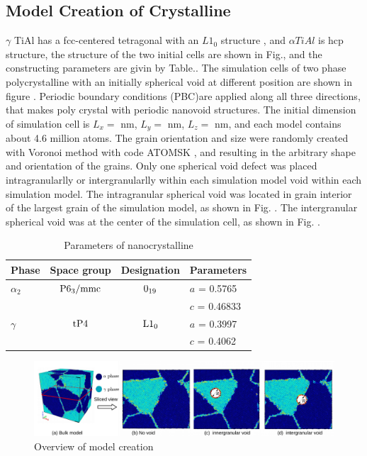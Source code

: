 \documentclass[journal,article,submit,moreauthors,pdftex,10pt,a4paper]{Definitions/mdpi}
\begin{document}
\subsection{Model Creation of Crystalline}
$\gamma $ TiAl has a fcc-centered tetragonal with an $L1_0$ structure \cite{}, and $\alpha TiAl$ is hcp structure, the structure of the two initial cells are shown in Fig.\cite{}, and the constructing parameters are givin by Table.\cite{}. The simulation cells of two phase polycrystalline with an initially spherical void at different position are shown in figure \cite{}. Periodic boundary conditions (PBC)are applied along all three directions, that makes poly crystal with periodic nanovoid structures. The initial dimension of simulation cell is  $L_x = $ nm, $L_y = $ nm, $L_z = $ nm, and each model contains about 4.6 million atoms. The grain orientation and size were randomly created with Voronoi method with code ATOMSK \cite{}, and resulting in the arbitrary shape and orientation of the grains. Only one spherical void defect was placed intragranularlly or intergranularlly within each simulation model void within each simulation model. The intragranular spherical void was located in grain interior of the largest grain of the simulation model, as shown in Fig. \cite{}. The intergranular spherical void was at the center of the simulation cell, as shown in Fig. \cite{}.
	
	\begin{table}[h]
		\centering
		\caption{Parameters of  nanocrystalline}
		
		\begin{tabular}{l c c l}
			\hline
			Phase			& Space group		& Designation		& Parameters \\
			\hline
			$\alpha_2$		& $\rm P6_3/mmc$ 	& $\rm 0_{19}$ 		& $a$ = 0.5765 \\
			&					&					& $c$ = 0.46833 \\
			$\gamma$		& $\rm tP4$ 		& $\rm L1_0$		& $a$ = 0.3997 \\
			&					&					& $c$ = 0.4062 \\			
			\hline
		\end{tabular} 
		\label{tab:lattice_parameter}
	\end{table} 
	
	
	\begin{figure}[h]
		\centering
		\includegraphics[width=1\linewidth]{img/models}
		\caption{Overview of model creation}
		\label{fig:model-creation}
	\end{figure}
	
\end{document}
